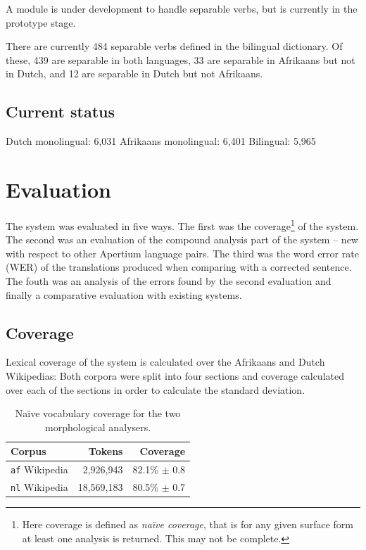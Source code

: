 \documentclass[11pt]{article}
\begin{document}
A module is under development to handle separable verbs, but is currently
in the prototype stage.

There are currently 484 separable verbs defined in the bilingual
dictionary. Of these, 439 are separable in both languages, 33 are
separable in Afrikaans but not in Dutch, and 12 are separable in
Dutch but not Afrikaans.

\subsection{Current status}

Dutch monolingual: 6,031
Afrikaans monolingual: 6,401
Bilingual: 5,965

\section{Evaluation}

The system was evaluated in five ways. The first was the 
coverage\footnote{Here coverage is defined as \emph{na\"ive coverage}, 
that is for any given surface form at least one analysis is returned. This 
may not be complete.} of the system. The second was an evaluation of the 
compound analysis part of the system -- new with respect to other 
Apertium language pairs. The third was the word error 
rate (WER) of the translations produced when comparing with a 
corrected sentence. The fouth was an analysis of the errors found by the second
evaluation and finally a comparative evaluation with existing systems.

\subsection{Coverage}

Lexical coverage of the system is calculated over the Afrikaans and Dutch Wikipedias:
Both corpora were split into four sections and coverage calculated over each of the 
sections in order to calculate the standard deviation.

\begin{table}
  \begin{center}
  \begin{tabular}{|l|r|r|}
   \hline
   {\bf Corpus}           & {\bf Tokens}    & {\bf Coverage}\\
   \hline
   {\tt af} Wikipedia     & 2,926,943       & 82.1\% $\pm$ 0.8 \\
   \hline
   {\tt nl} Wikipedia     & 18,569,183      & 80.5\% $\pm$ 0.7 \\
   \hline
  \end{tabular}
    \caption{Na\"ive vocabulary coverage for the two morphological analysers.}
    \label{table:coverage}
  \end{center}
\end{table}
\end{document}
